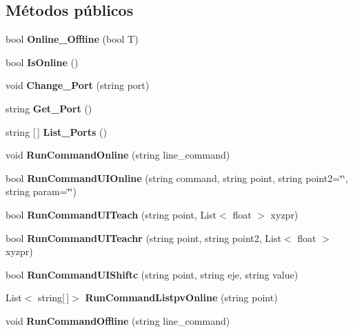 \subsection*{Métodos públicos}
\begin{DoxyCompactItemize}
\item 
\mbox{\label{class_controller_adf43cf5f8f242a3d831f3162aef0d705}} 
bool {\bfseries Online\+\_\+\+Offline} (bool T)
\item 
\mbox{\label{class_controller_afc8517ea3abd9acb92173b55342b320a}} 
bool {\bfseries Is\+Online} ()
\item 
\mbox{\label{class_controller_a9d890757158c307d9e9d1915b03b5928}} 
void {\bfseries Change\+\_\+\+Port} (string port)
\item 
\mbox{\label{class_controller_a8a4b22a9b00f39da6e6c2dc063066460}} 
string {\bfseries Get\+\_\+\+Port} ()
\item 
\mbox{\label{class_controller_a7cd4400bd0fe69494c14002b6b2fa649}} 
string \mbox{[}$\,$\mbox{]} {\bfseries List\+\_\+\+Ports} ()
\item 
\mbox{\label{class_controller_a92811ce0f1bce922136d254730a1be8f}} 
void {\bfseries Run\+Command\+Online} (string line\+\_\+command)
\item 
\mbox{\label{class_controller_ae08a706bf80dc97741a7eb65a3ece6d3}} 
bool {\bfseries Run\+Command\+U\+I\+Online} (string command, string point, string point2=\char`\"{}\char`\"{}, string param=\char`\"{}\char`\"{})
\item 
\mbox{\label{class_controller_abeae24ba81e6f83fd3c2502981143212}} 
bool {\bfseries Run\+Command\+U\+I\+Teach} (string point, List$<$ float $>$ xyzpr)
\item 
\mbox{\label{class_controller_a62cb3a2673bf180265a2965bdd3e4cb3}} 
bool {\bfseries Run\+Command\+U\+I\+Teachr} (string point, string point2, List$<$ float $>$ xyzpr)
\item 
\mbox{\label{class_controller_a5a7b660e3aebb0220e923c28ede75bc6}} 
bool {\bfseries Run\+Command\+U\+I\+Shiftc} (string point, string eje, string value)
\item 
\mbox{\label{class_controller_a65282850ef11298e5acd69b9ac61cdca}} 
List$<$ string\mbox{[}$\,$\mbox{]}$>$ {\bfseries Run\+Command\+Listpv\+Online} (string point)
\item 
\mbox{\label{class_controller_aa579bf7f25f6004e8e0e25a2dd044315}} 
void {\bfseries Run\+Command\+Offline} (string line\+\_\+command)
\end{DoxyCompactItemize}
